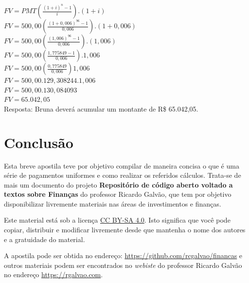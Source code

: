\documentclass[
	article,			%
	11pt,				%
	oneside,			%
	a4paper,			%
	english,			%
	brazil,				%
	sumario=tradicional
	]{abntex2}
\begin{document}
\noindent $ FV = PMT \left( \frac{ ( 1 + i ) ^{n} - 1 }{ i } \right).(1 + i) $\\

\noindent $ FV = 500,00 \left( \frac{ ( 1 + 0,006 ) ^{96} - 1 }{ 0,006 } \right). (1 + 0,006) $\\

\noindent $ FV = 500,00 \left( \frac{ ( 1,006 ) ^{96} - 1 }{ 0,006 }\right).(1,006) $\\

\noindent $ FV = 500,00 \left( \frac{ 1,775849 - 1 }{ 0,006 } \right).1,006 $\\

\noindent $ FV = 500,00 \left( \frac{ 0,775849 }{ 0,006 }\right)1,006  $\\

\noindent $ FV = 500,00 . 129,308244.1,006 $\\

\noindent $ FV = 500,00 . 130,084093 $\\

\noindent $ FV = 65.042,05$\\
\noindent Resposta: Bruna deverá acumular um montante de R\$ 65.042,05.



\section{Conclusão}
Esta breve apostila teve por objetivo compilar de maneira concisa o que é uma série de pagamentos uniformes e como realizar os referidos cálculos.
Trata-se de mais um documento do projeto \textbf{Repositório de código aberto voltado a textos sobre Finanças} do professor Ricardo Galvão, que tem por objetivo disponibilizar livremente materiais nas áreas de investimentos e finanças.

Este material está sob a licença  \href{http://creativecommons.org/licenses/by-sa/4.0/}{CC BY-SA 4.0}. Isto significa que você pode copiar, distribuir e modificar livremente desde que mantenha o nome dos autores e a gratuidade do material.

A apostila pode ser obtida no endereço: \href{https://github.com/rcgalvao/financas}{https://github.com/rcgalvao/financas} e outros materiais podem ser encontrados no \textit{webiste} do professor Ricardo Galvão no endereço \href{https://rgalvao.com}{https://rgalvao.com}.






\end{document}
